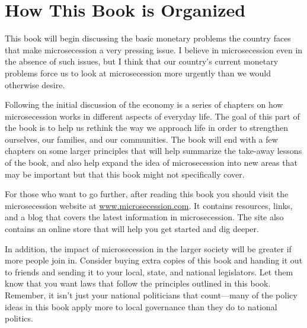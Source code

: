 \section{How This Book is Organized}

This book will begin discussing the basic monetary problems the country
faces that make microsecession a very pressing issue. I believe in
microsecession even in the absence of such issues, but I think that
our country’s current monetary problems force us to look at
microsecession more urgently than we would otherwise desire. 

Following the initial discussion of the economy is a series of chapters
on how microsecession works in different aspects of everyday life. The
goal of this part of the book is to help us rethink the way we approach
life in order to strengthen ourselves, our families, and our
communities. The book will end with a few chapters on some larger
principles that will help summarize the take-away lessons of the book,
and also help expand the idea of microsecession into new areas
that may be important but that this book might not specifically cover.

\begin{infonote}
For those who want to go further, after reading this book you should  
visit the microsecession website at \url{www.microsecession.com}.
It contains resources, links, and a blog that covers the latest information
in microsecession.  The site also contains an online store that
will help you get started and dig deeper.

In addition, the impact of microsecession in the larger society will be greater if
more people join in.  Consider buying extra copies of this book
and handing it out to friends and sending it to your local, state,
and national legislators.  Let them know that you want laws
that follow the principles outlined in this book.  Remember, it
isn't just your national politicians that count---many of the policy
ideas in this book apply more to local governance than they do to 
national politics.
\end{infonote}
